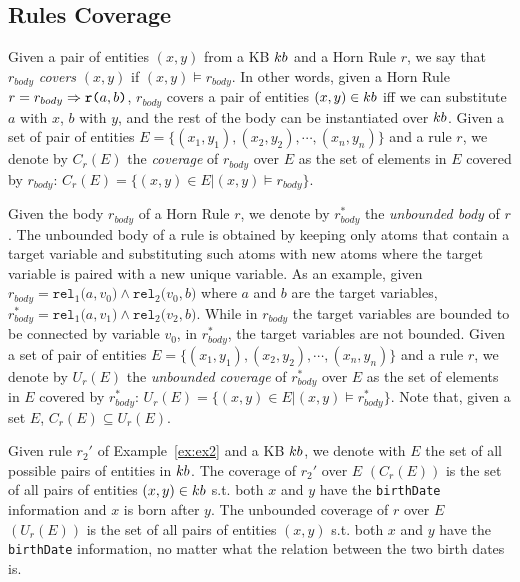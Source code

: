 \subsection{Rules Coverage}
Given a pair of entities $(x,y)$ from a KB ${\sc kb}$ and a Horn Rule $r$, we say that $r_{body}$ \emph{covers} $(x,y)$ if
$(x,y) \models r_{body}$. In other words, given a Horn Rule $r = r_{body} \Rightarrow \texttt{r(}a,b\texttt{)}$, $r_{body}$ covers a pair of entities $(x,y) \in {\sc kb}$ iff we can substitute $a$ with $x$, $b$ with $y$, and the rest of the body can be instantiated over ${\sc kb}$. Given a set of pair of entities $E = \{(x_1,y_1),(x_2,y_2),\cdots,(x_n,y_n)\}$ and a rule $r$, we denote by $C_r(E)$ the \emph{coverage} of $r_{body}$ over $E$ as the set of elements in $E$ covered by $r_{body}$: $C_r(E)=\{(x,y) \in E | (x,y) \models r_{body}\}$.

Given the body $r_{body}$ of a Horn Rule $r$, we denote by $r^{*}_{body}$ the \emph{unbounded body} of $r$. The unbounded body of a rule is obtained by keeping only atoms that contain a target variable and substituting such atoms with new atoms where the target variable is paired with a new unique variable. As an example, given $r_{body} = \texttt{rel}_1\texttt{(}a,v_0\texttt{)} \wedge \texttt{rel}_2\texttt{(}v_0,b\texttt{)}$ where $a$ and $b$ are the target variables, $r^{*}_{body} = \texttt{rel}_1\texttt{(}a,v_1\texttt{)} \wedge \texttt{rel}_2\texttt{(}v_2,b\texttt{)}$.
While in $r_{body}$ the target variables are bounded to be connected by variable $v_0$, in $r^{*}_{body}$, the target variables are not bounded.
Given a set of pair of entities $E = \{(x_1,y_1),(x_2,y_2),\cdots,(x_n,y_n)\}$ and a rule $r$, we denote by $U_r(E)$ the \emph{unbounded coverage} of $r^{*}_{body}$ over $E$ as the set of elements in $E$ covered by $r^{*}_{body}$: $U_r(E)=\{(x,y) \in E | (x,y) \models r^{*}_{body}\}$. Note that, given a set $E$, $C_r(E) \subseteq U_r(E)$. 

\begin{example}
	Given rule $r_2'$ of Example~\ref{ex:ex2} and a KB ${\sc kb}$, we denote with $E$ the set of all possible pairs of entities in ${\sc kb}$. The coverage of $r_2'$ over $E$ $(C_r(E))$ is the set of all pairs of entities $(x,y) \in {\sc kb}$ s.t. both $x$ and $y$ have the \texttt{birthDate} information and $x$ is born after $y$. The unbounded coverage of $r$ over $E$ $(U_r(E))$ is the set of all pairs of entities $(x,y)$ s.t. both $x$ and $y$ have the \texttt{birthDate} information, no matter what the relation between the two birth dates is. 
\end{example} 

